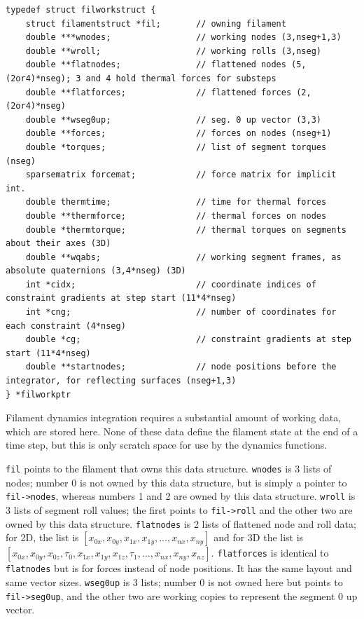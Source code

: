 \documentclass {scrbook}
\newcommand {\ttt} {\texttt}
\begin{document}
\begin{lstlisting}
typedef struct filworkstruct {
    struct filamentstruct *fil;       // owning filament
    double ***wnodes;                 // working nodes (3,nseg+1,3)
    double **wroll;                   // working rolls (3,nseg)
    double **flatnodes;               // flattened nodes (5,(2or4)*nseg); 3 and 4 hold thermal forces for substeps
    double **flatforces;              // flattened forces (2,(2or4)*nseg)
    double **wseg0up;                 // seg. 0 up vector (3,3)
    double **forces;                  // forces on nodes (nseg+1)
    double *torques;                  // list of segment torques (nseg)
    sparsematrix forcemat;            // force matrix for implicit int.
    double thermtime;                 // time for thermal forces
    double **thermforce;              // thermal forces on nodes
    double *thermtorque;              // thermal torques on segments about their axes (3D)
    double **wqabs;                   // working segment frames, as absolute quaternions (3,4*nseg) (3D)
    int *cidx;                        // coordinate indices of constraint gradients at step start (11*4*nseg)
    int *cng;                         // number of coordinates for each constraint (4*nseg)
    double *cg;                       // constraint gradients at step start (11*4*nseg)
    double **startnodes;              // node positions before the integrator, for reflecting surfaces (nseg+1,3)
} *filworkptr
\end{lstlisting}

Filament dynamics integration requires a substantial amount of working data, which are stored here. None of these data define the filament state at the end of a time step, but this is only scratch space for use by the dynamics functions.

\ttt{fil} points to the filament that owns this data structure. \ttt{wnodes} is 3 lists of nodes; number 0 is not owned by this data structure, but is simply a pointer to \ttt{fil->nodes}, whereas numbers 1 and 2 are owned by this data structure. \ttt{wroll} is 3 lists of segment roll values; the first points to \ttt{fil->roll} and the other two are owned by this data structure. \ttt{flatnodes} is 2 lists of flattened node and roll data; for 2D, the list is $[x_{0x}, x_{0y}, x_{1x}, x_{1y},..., x_{nx}, x_{ny}]$ and for 3D the list is $[x_{0x},x_{0y},x_{0z},\tau_{0},x_{1x},x_{1y},x_{1z},\tau_1,...,x_{nx},x_{ny},x_{nz}]$. \ttt{flatforces} is identical to \ttt{flatnodes} but is for forces instead of node positions. It has the same layout and same vector sizes. \ttt{wseg0up} is 3 lists; number 0 is not owned here but points to \ttt{fil->seg0up}, and the other two are working copies to represent the segment 0 up vector.
\end{document}
